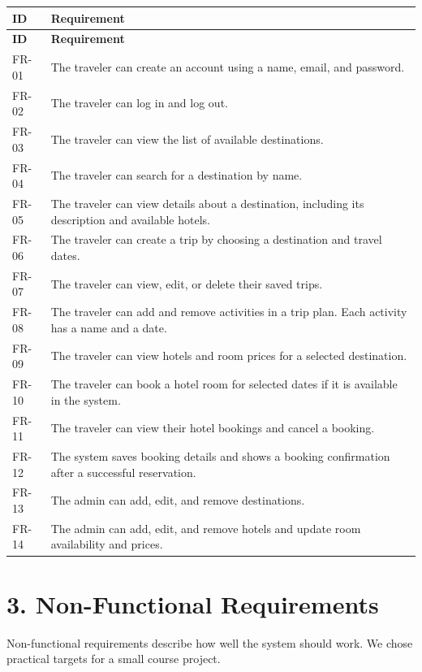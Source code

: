 \documentclass[11pt,a4paper]{article}
\begin{document}
\small
\begin{longtable}{|>{\raggedright\arraybackslash}p{1.05cm}|>{\raggedright\arraybackslash}p{12.7cm}|}
\hline
\rowcolor{lightblue}\textbf{ID} & \textbf{Requirement}\\\hline
\endfirsthead
\hline\rowcolor{lightblue}\textbf{ID} & \textbf{Requirement}\\\hline
\endhead
FR-01 & The traveler can create an account using a name, email, and password.\\\hline
FR-02 & The traveler can log in and log out.\\\hline
FR-03 & The traveler can view the list of available destinations.\\\hline
FR-04 & The traveler can search for a destination by name.\\\hline
FR-05 & The traveler can view details about a destination, including its description and available hotels.\\\hline
FR-06 & The traveler can create a trip by choosing a destination and travel dates.\\\hline
FR-07 & The traveler can view, edit, or delete their saved trips.\\\hline
FR-08 & The traveler can add and remove activities in a trip plan. Each activity has a name and a date.\\\hline
FR-09 & The traveler can view hotels and room prices for a selected destination.\\\hline
FR-10 & The traveler can book a hotel room for selected dates if it is available in the system.\\\hline
FR-11 & The traveler can view their hotel bookings and cancel a booking.\\\hline
FR-12 & The system saves booking details and shows a booking confirmation after a successful reservation.\\\hline
FR-13 & The admin can add, edit, and remove destinations.\\\hline
FR-14 & The admin can add, edit, and remove hotels and update room availability and prices.\\\hline
\end{longtable}
\normalsize

\section{3. Non-Functional Requirements}
Non-functional requirements describe how well the system should work. We chose practical targets for a small course project.
\end{document}
